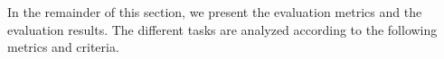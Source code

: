 In the remainder of this section, we present the evaluation metrics and the evaluation results.
The different tasks are analyzed according to the following metrics and criteria.







%
%
%

